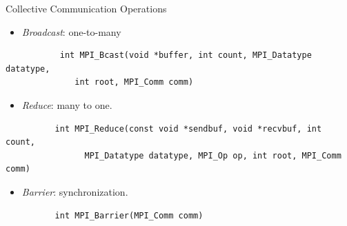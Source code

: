 \begin{frame}[fragile]{Collective Communication Operations}

\begin{itemize}
\item \textit{Broadcast}: one-to-many
\end{itemize}
\small\begin{verbatim}
           int MPI_Bcast(void *buffer, int count, MPI_Datatype datatype,
              int root, MPI_Comm comm)
\end{verbatim}
\normalsize
    \begin{itemize}
    \item \textit{Reduce}: many to one.
    \end{itemize}
\small\begin{verbatim}
          int MPI_Reduce(const void *sendbuf, void *recvbuf, int count,
                MPI_Datatype datatype, MPI_Op op, int root, MPI_Comm comm)
\end{verbatim}

   \begin{itemize}
    \item \textit{Barrier}: synchronization.
    \end{itemize}
\small\begin{verbatim}
          int MPI_Barrier(MPI_Comm comm)
\end{verbatim}




\end{frame}




